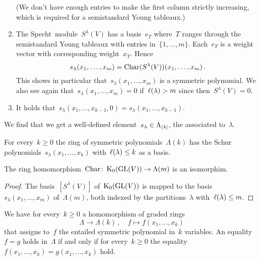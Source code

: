 \documentclass[a4paper,10pt]{scrartcl}
\begin{document}
\begin{example}
\begin{enumerate}
      (We don’t have enough entries to make the first column strictly increasing, which is required for a semistandard Young tableaux.)
    \item
      The Specht~module~$S^\lambda(V)$ has a basis~$e_T$ where~$T$ ranges through the semistandard Young tableaux with entries in~$\{1, \dotsc, m\}$.
      Each~$e_T$ is a weight vector with corresponding weight~$x_T$.
      Hence
      \[
        s_\lambda(x_1, \dotsc, x_m)
        =
        \operatorname{Char}(S^\lambda(V))(x_1, \dotsc, x_m) \,.
      \]
      This shows in particular that~$s_\lambda(x_1, \dotsc, x_m)$ is a symmetric polynomial.
      We also see again that~$s_\lambda(x_1, \dotsc, x_m) = 0$ if~$\operatorname{\ell}(\lambda) > m$ since then~$S^\lambda(V) = 0$.
    \item
      It holds that~$s_\lambda(x_1, \dotsc, x_{k-1}, 0) = s_\lambda(x_1, \dotsc, x_{k-1})$.
  \end{enumerate}
  We find that we get a well-defined element~$s_\lambda \in \Lambda_{\lvert\lambda\rvert}$, the  associated to~$\lambda$.
\end{example}

\begin{proposition}
  For every~$k \geq 0$ the ring of symmetric polynomials~$\Lambda(k)$ has the Schur polynomials~$s_\lambda(x_1, \dotsc, x_k)$ with~$\operatorname{\ell}(\lambda) \leq k$ as a basis.
\end{proposition}

\begin{corollary}
  The ring homomorphism~$\operatorname{Char} \colon \operatorname{K}_0(\operatorname{GL}(V)) \to \Lambda(m)$ is an isomorphim.
\end{corollary}

\begin{proof}
  The basis~$[S^\lambda(V)]$ of~$\operatorname{K}_0(\operatorname{GL}(V))$ is mapped to the basis~$s_\lambda(x_1, \dotsc, x_m)$ of~$\Lambda(m)$, both indexed by the partitions~$\lambda$ with~$\operatorname{\ell}(\lambda) \leq m$.
\end{proof}

We have for every~$k \geq 0$ a homomorphism of graded rings
\[
  \Lambda
  \to
  \Lambda(k) \,,
  \quad
  f
  \mapsto
  f(x_1, \dotsc, x_k)
\]
that assigns to~$f$ the entailed symmetric polynomial in~$k$ variables.
An equality~$f = g$ holds in~$\Lambda$ if and only if for every~$k \geq 0$ the equality~$f(x_1, \dotsc, x_k) = g(x_1, \dotsc, x_k)$ hold.

\end{document}
